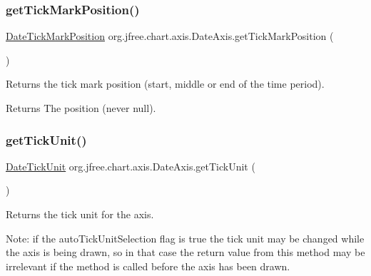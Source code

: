 \subsubsection{\texorpdfstring{get\+Tick\+Mark\+Position()}{getTickMarkPosition()}}
{\footnotesize\ttfamily \mbox{\hyperlink{classorg_1_1jfree_1_1chart_1_1axis_1_1_date_tick_mark_position}{Date\+Tick\+Mark\+Position}} org.\+jfree.\+chart.\+axis.\+Date\+Axis.\+get\+Tick\+Mark\+Position (\begin{DoxyParamCaption}{ }\end{DoxyParamCaption})}

Returns the tick mark position (start, middle or end of the time period).

\begin{DoxyReturn}{Returns}
The position (never {\ttfamily null}). 
\end{DoxyReturn}
\mbox{\label{classorg_1_1jfree_1_1chart_1_1axis_1_1_date_axis_a8cc10a62c85228fd1431a9d15c7dabe8}} 
\subsubsection{\texorpdfstring{get\+Tick\+Unit()}{getTickUnit()}}
{\footnotesize\ttfamily \mbox{\hyperlink{classorg_1_1jfree_1_1chart_1_1axis_1_1_date_tick_unit}{Date\+Tick\+Unit}} org.\+jfree.\+chart.\+axis.\+Date\+Axis.\+get\+Tick\+Unit (\begin{DoxyParamCaption}{ }\end{DoxyParamCaption})}

Returns the tick unit for the axis. 

Note\+: if the {\ttfamily auto\+Tick\+Unit\+Selection} flag is {\ttfamily true} the tick unit may be changed while the axis is being drawn, so in that case the return value from this method may be irrelevant if the method is called before the axis has been drawn.

